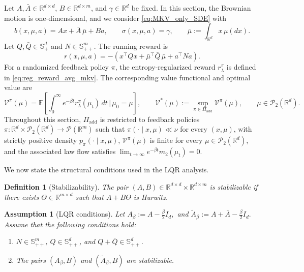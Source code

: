 \documentclass[a4paper, 10pt, english, reqno]{amsart}
\newtheorem{assumptions}[theorem]{Assumption}
\newtheorem{definition}[theorem]{Definition}
\begin{document}
Let $A,\bar A\in\mathbb R^{d\times d}$, $B\in\mathbb R^{d\times m}$, and $\gamma\in\mathbb R^d$ be fixed. In this section, the Brownian motion is one-dimensional, and we consider \eqref{eq:MKV_only_SDE} with
\begin{equation}
\label{eq:setting_lqr_for_phibe}
  b(x,\mu,a)=Ax+\bar A\,\bar\mu+Ba,
  \qquad
  \sigma(x,\mu,a)=\gamma,
  \qquad
  \bar\mu:=\int_{\mathbb R^d}x\,\mu(dx).
\end{equation}
Let $Q,\bar Q\in\mathbb S_+^d$ and $N\in\mathbb S_{++}^m$. The running reward is
\begin{equation}
\label{eq:reward_LQR_simplify}
  r(x,\mu,a)
  =
  -
  \left(
    x^\top Qx
    +
    \bar\mu^\top\bar Q\,\bar\mu
    +
    a^\top Na
  \right).
    \end{equation}
For a randomized feedback policy $\pi$, the entropy-regularized reward $r_\lambda^\pi$ is defined in \eqref{eq:reg_reward_avg_mkv}. The corresponding value functional and optimal value are
\begin{equation}
\label{eq:LQR-MKV-value-functional}
  \mathcal V^\pi(\mu)
  =
  \mathbb E\left[
    \int_0^\infty e^{-\beta t}
    r_\lambda^\pi(\mu_t)\,dt
    \,\bigg|\,
    \mu_0=\mu
  \right],
  \qquad
  \mathcal V^*(\mu)
  :=
  \sup_{\pi\in\Pi_{\mathrm{add}}}\mathcal V^\pi(\mu),
  \qquad
  \mu\in\mathcal P_2(\mathbb R^d).
\end{equation}
Throughout this section, $\Pi_{\mathrm{add}}$ is restricted to feedback policies $\pi:\mathbb R^d\times\mathcal P_2(\mathbb R^d)\to\mathcal P(\mathbb R^m)$ such that $\pi(\cdot\mid x,\mu)\ll\nu$ for every $(x,\mu)$, with strictly positive density $p_\pi(\cdot\mid x,\mu)$, $\mathcal V^\pi(\mu)$ is finite for every $\mu\in\mathcal P_2(\mathbb R^d)$, and the associated law flow satisfies $\lim_{t\to\infty}e^{-\beta t}m_2(\mu_t)=0$.

We now state the structural conditions used in the LQR analysis.

\begin{definition}[Stabilizability]
\label{def:LQR-MKV-stab-detect}
The pair $(A,B)\in\mathbb R^{d\times d}\times\mathbb R^{d\times m}$ is stabilizable if there exists $\Theta\in\mathbb R^{m\times d}$ such that $A+B\Theta$ is Hurwitz.
\end{definition}

\begin{assumptions}[LQR conditions]
\label{ass:LQR-MKV}
Let $A_\beta:=A-\frac{\beta}{2}I_d,$ and $\widetilde A_\beta:=A+\bar A-\frac{\beta}{2}I_d.$
Assume that the following conditions hold:
\begin{enumerate}
  \item[(H1)] $N\in\mathbb S_{++}^m$, $Q\in\mathbb S_{++}^d$, and $Q+\bar Q\in\mathbb S_{++}^d$.
  \item[(H2)] The pairs $(A_\beta,B)$ and $(\widetilde A_\beta,B)$ are stabilizable.
\end{enumerate}
\end{assumptions}
\end{document}
